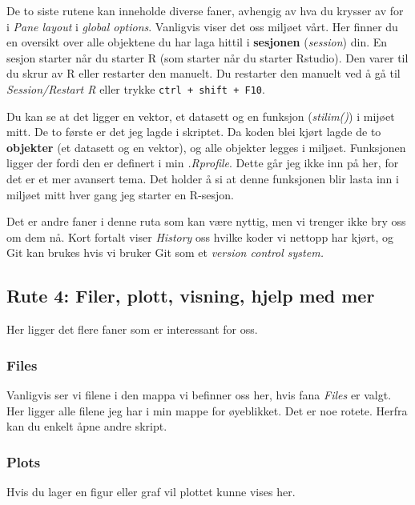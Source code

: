 \documentclass[
  letterpaper,
  DIV=11,
  numbers=noendperiod]{scrreprt}
\begin{document}
De to siste rutene kan inneholde diverse faner, avhengig av hva du
krysser av for i \emph{Pane layout} i \emph{global options}. Vanligvis
viser det oss miljøet vårt. Her finner du en oversikt over alle
objektene du har laga hittil i \textbf{sesjonen} (\emph{session}) din.
En sesjon starter når du starter R (som starter når du starter Rstudio).
Den varer til du skrur av R eller restarter den manuelt. Du restarter
den manuelt ved å gå til \emph{Session/Restart R} eller trykke
\texttt{ctrl\ +\ shift\ +\ F10}.

Du kan se at det ligger en vektor, et datasett og en funksjon
(\emph{stilim()}) i mijøet mitt. De to første er det jeg lagde i
skriptet. Da koden blei kjørt lagde de to \textbf{objekter} (et datasett
og en vektor), og alle objekter legges i miljøet. Funksjonen ligger der
fordi den er definert i min \emph{.Rprofile}. Dette går jeg ikke inn på
her, for det er et mer avansert tema. Det holder å si at denne
funksjonen blir lasta inn i miljøet mitt hver gang jeg starter en
R-sesjon.

Det er andre faner i denne ruta som kan være nyttig, men vi trenger ikke
bry oss om dem nå. Kort fortalt viser \emph{History} oss hvilke koder vi
nettopp har kjørt, og Git kan brukes hvis vi bruker Git som et
\emph{version control system.}

\hypertarget{rute-4-filer-plott-visning-hjelp-med-mer}{%
\subsection{Rute 4: Filer, plott, visning, hjelp med
mer}\label{rute-4-filer-plott-visning-hjelp-med-mer}}

Her ligger det flere faner som er interessant for oss.

\hypertarget{files}{%
\subsubsection{Files}\label{files}}

Vanligvis ser vi filene i den mappa vi befinner oss her, hvis fana
\emph{Files} er valgt. Her ligger alle filene jeg har i min mappe for
øyeblikket. Det er noe rotete. Herfra kan du enkelt åpne andre skript.

\hypertarget{plots}{%
\subsubsection{Plots}\label{plots}}

Hvis du lager en figur eller graf vil plottet kunne vises her.
\end{document}
